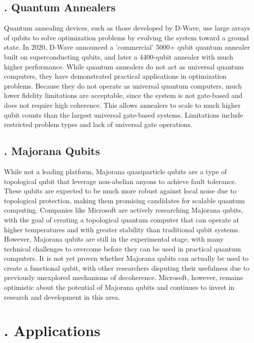 \documentclass{elbioimp2}
\begin{document}
\subsection{. Quantum Annealers}

Quantum annealing devices, such as those developed by D-Wave, use large arrays of qubits to solve optimization problems by evolving the system toward a ground state. In 2020, D-Wave announced a 'commercial' 5000+ qubit quantum annealer built on superconducting qubits, and later a 4400-qubit annealer with much higher performance\cite{DWave2024}. While quantum annealers do not act as universal quantum computers, they have demonstrated practical applications in optimization problems. Because they do not operate as universal quantum computers, much lower fidelity limitations are acceptable, since the system is not gate-based and does not require high coherence. This allows annealers to scale to much higher qubit counts than the largest universal gate-based systems. Limitations include restricted problem types and lack of universal gate operations.

\subsection{. Majorana Qubits}

While not a leading platform, Majorana quasiparticle qubits are a type of topological qubit that leverage non-abelian anyons to achieve fault tolerance. These qubits are expected to be much more robust against local noise due to topological protection, making them promising candidates for scalable quantum computing. Companies like Microsoft are actively researching Majorana qubits, with the goal of creating a topological quantum computer that can operate at higher temperatures and with greater stability than traditional qubit systems. However, Majorana qubits are still in the experimental stage, with many technical challenges to overcome before they can be used in practical quantum computers. It is not yet proven whether Majorana qubits can actually be used to create a functional qubit, with other researchers disputing their usefulness due to previously unexplored mechanisms of decoherence\cite{alase2025decoherencemajoranaqubits1f}. Microsoft, however, remains optimistic about the potential of Majorana qubits and continues to invest in research and development in this area.

\section{. Applications}
\end{document}
